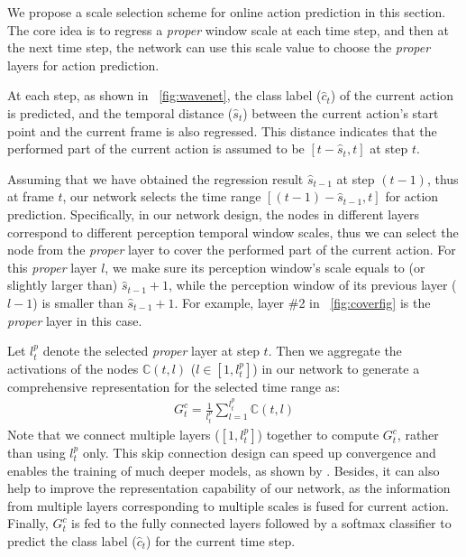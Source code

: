 \documentclass[10pt,twocolumn,letterpaper]{article}
\begin{document}
We propose a scale selection scheme for online action prediction in this section. The core idea is to regress a \emph{proper} window scale at each time step,
and then at the next time step,
the network can use this scale value to choose the \emph{proper} layers for action prediction.

At each step, as shown in \figurename{~\ref{fig:wavenet}},
the class label ($\hat{c}_{t}$) of the current action is predicted,
and the temporal distance ($\hat{s}_t$) between the current action's start point and the current frame is also regressed.
This distance indicates that the performed part of the current action is assumed to be $[t-\hat{s}_t, t]$ at step $t$.


Assuming that we have obtained the regression result $\hat{s}_{t-1}$ at step $(t-1)$,
thus at frame $t$, our network selects the time range $[(t-1)-\hat{s}_{t-1}, t]$ for action prediction. Specifically, in our network design, the nodes in different layers correspond to different perception temporal window scales,
thus we can select the node from the \emph{proper} layer to cover the performed part of the current action.
For this \emph{proper} layer $l$, we make sure its perception window's scale equals to (or slightly larger than) $\hat{s}_{t-1}+1$,
while the perception window of its previous layer ($l-1$) is smaller than $\hat{s}_{t-1}+1$.
For example, layer \#2 in \figurename{~\ref{fig:coverfig}} is the \emph{proper} layer in this case.


Let $l_t^p$ denote the selected \emph{proper} layer at step $t$.
Then we aggregate the activations of the nodes $\mathbb{C}(t,l)$ ($l\in[1,l_t^p]$) in our network to generate a comprehensive representation for the selected time range as:
\begin{eqnarray}
\label{eq:skipconnectionC}
{G_t^c} = \frac{1}{l_t^p}\sum\limits_{l=1}^{l_t^p}  \mathbb{C}(t,l)
\end{eqnarray}
Note that we connect multiple layers ($[1,l_t^p]$) together to compute ${G_t^c}$,
rather than using $l_t^p$ only.
This skip connection design can speed up convergence and enables the training of much deeper models,
as shown by \cite{he2016deep,he2016identity}.
Besides, it can also help to improve the representation capability of our network,
as the information from multiple layers corresponding to multiple scales is fused for current action.
Finally, ${G_t^c}$ is fed to the fully connected layers followed by a softmax classifier to predict the class label ($\hat{c}_{t}$) for the current time step.
\end{document}
